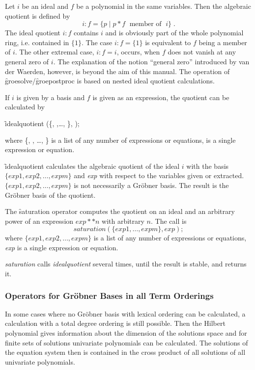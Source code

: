  
\hypertarget{operator:IDEALQUOTIENT}{}
Let $i$ be an ideal and $f$ be a polynomial in the same
variables. Then the algebraic quotient is defined by
\[
i:f = \{ p \;| \; p * f \;\mbox{    member of }\; i\}\;.
\]
The ideal quotient $i:f$ contains $i$ and is obviously part of the
whole polynomial ring, i.e. contained in $\{1\}$. The case $i:f =
\{1\}$ is equivalent to $f$ being a member of  $i$. The other extremal
case, $i:f=i$, occurs, when $f$ does not vanish at any general zero of $i$.
The explanation of the notion ``general zero'' introduced by van der
Waerden, however, is beyond the aim of this manual. The operation
of \f{groesolve}/\f{groepostproc} is based on nested ideal quotient
calculations.

If $i$ is given by a basis and $f$ is given as an expression, the
quotient can be calculated by
\begin{syntax}
  \f{idealquotient} (\{, ,\ldots , \}, );
\end{syntax}
where \{, , \ldots , \} is a list of any number of
expressions or equations,  is a single expression or equation.

\f{idealquotient} calculates the algebraic quotient of the ideal $i$
with the basis  $\{exp1, exp2, \ldots , expm\}$ and \textit{exp} with
respect to  the variables given or extracted.  $\{exp1, exp2, \ldots ,
expm\}$ is not necessarily a Gr\"obner basis.
The result is the Gr\"obner basis of the quotient.

\hypertarget{operator:SATURATION}{}
The \f{saturation} operator computes the quotient on an ideal and an arbitrary power
of an expression $exp**n$ with arbitrary $n$. The call is
\[ saturation (\{exp1, \ldots , expm\}, exp); \]
where $\{exp1, exp2, \ldots , expm\}$ is a list of any number of
expressions or equations, \textit{exp} is a single expression or equation.

\emph{saturation} calls \emph{idealquotient} several times, until the result is
stable, and returns it.

\subsubsection{Operators for Gr\"obner Bases in all Term Orderings}
In some cases where no Gr\"obner
basis with lexical ordering can be calculated, a calculation with a total
degree ordering is still possible. Then the Hilbert polynomial gives
information about the dimension of the solutions space and for finite
sets of solutions univariate polynomials can be calculated. The solutions
of the equation system then is contained in the cross product of all
solutions of all univariate polynomials.

